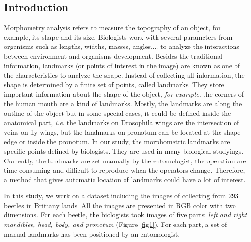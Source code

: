 \documentclass{article} %
\begin{document}
\begin{multicols}{2}



\section{ Introduction}
Morphometry analysis refers to measure the topography of an object, for example, its shape and its size. Biologists work with several parameters from organisms such as lengths, widths, masses, angles,... to analyze the interactions between environment and organisms development. Besides the traditional information, landmarks (or points of interest in the image) are known as one of the characteristics to analyze the shape. Instead of collecting all information, the shape is determined by a finite set of points, called landmarks. They store important information about the shape of the object, \textit{for example}, the corners of the human mouth are a kind of landmarks. Mostly, the landmarks are along the outline of the object but in some special cases, it could be defined inside the anatomical part, \textit{i.e.} the landmarks on Drosophila wings are the intersection of veins on fly wings, but the landmarks on pronotum can be located at the shape edge or inside the pronotum. In our study, the morphometric landmarks are specific points defined by biologists. They are used in many biological studyings. Currently, the landmarks are set manually by the entomologist, the operation are time-consuming and difficult to reproduce when the operators change. Therefore, a method that gives automatic location of landmarks could have a lot of interest.

In this study, we work on a dataset including the images of collecting from $293$ beetles in Brittany lands. All the images are presented in RGB color with two dimensions. For each beetle, the biologists took images of five parts: \textit{left and right mandibles, head, body, and pronotum} (Figure \ref{fig1}). For each part, a set of manual landmarks has been positioned by an entomologist.


\end{multicols}
\end{document}
